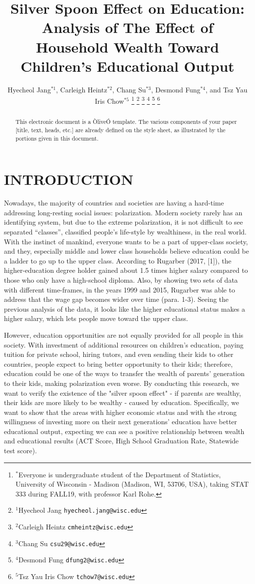 \documentclass[letterpaper, 10 pt, conference]{ieeeconf}  %
\title{\LARGE \bf
Silver Spoon Effect on Education: Analysis of The Effect of Household Wealth Toward Children's Educational Output
}
\author{Hyecheol Jang$^{*1}$, Carleigh Heintz$^{*2}$, Chang Su$^{*3}$, Desmond Fung$^{*4}$, and Tsz Yau Iris Chow$^{*5}$%
\thanks{$^{*}$Everyone is undergraduate student of the Department of  Statistics, University of Wisconsin - Madison (Madison, WI, 53706, USA), taking STAT 333 during FALL19, with professor Karl Rohe.}%
\thanks{$^{1}$Hyecheol Jang
        {\tt\small hyecheol.jang@wisc.edu}}%
\thanks{$^{2}$Carleigh Heintz
        {\tt\small cmheintz@wisc.edu}}%
\thanks{$^{3}$Chang Su
        {\tt\small csu29@wisc.edu}}%
\thanks{$^{4}$Desmond Fung
        {\tt\small dfung2@wisc.edu}}%
\thanks{$^{5}$Tsz Yau Iris Chow
        {\tt\small tchow7@wisc.edu}}%
}
\begin{document}
\maketitle
\thispagestyle{empty}
\pagestyle{empty}


\begin{abstract}

This electronic document is a ÒliveÓ template. The various components of your paper [title, text, heads, etc.] are already defined on the style sheet, as illustrated by the portions given in this document.

\end{abstract}


\section{INTRODUCTION}

Nowadays, the majority of countries and societies are having a hard-time addressing long-resting social issues: polarization.
Modern society rarely has an identifying system, but due to the extreme polarization, it is not difficult to see separated “classes”, classified people’s life-style by wealthiness, in the real world.
With the instinct of mankind, everyone wants to be a part of upper-class society, and they, especially middle and lower class households believe education could be a ladder to go up to the upper class.
According to Rugarber (2017, [1]), the higher-education degree holder gained about 1.5 times higher salary compared to those who only have a high-school diploma.
Also, by showing two sets of data with different time-frames, in the years 1999 and 2015, Rugarber was able to address that the wage gap becomes wider over time (para. 1-3).
Seeing the previous analysis of the data, it looks like the higher educational status makes a higher salary, which lets people move toward the upper class.

However, education opportunities are not equally provided for all people in this society.
With investment of additional resources on children’s education, paying tuition for private school, hiring tutors, and even sending their kids to other countries, people expect to bring better opportunity to their kids; therefore, education could be one of the ways to transfer the wealth of parents’ generation to their kids, making polarization even worse.
By conducting this research, we want to verify the existence of the "silver spoon effect" - if parents are wealthy, their kids are more likely to be wealthy - caused by education.
Specifically, we want to show that the areas with higher economic status and with the strong willingness of investing more on their next generations’ education have better educational output, expecting we can see a positive relationship between wealth and educational results (ACT Score, High School Graduation Rate, Statewide test score).
\end{document}
